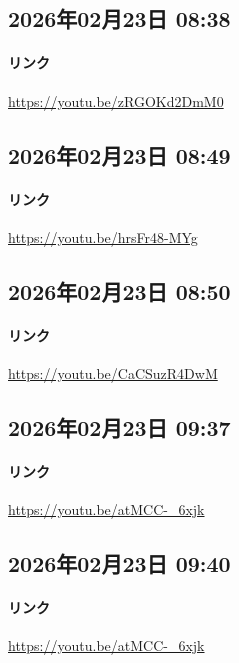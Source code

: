 \subsection*{2026年02月23日 08:38}

\paragraph{リンク}
\url{https://youtu.be/zRGOKd2DmM0}

\subsection*{2026年02月23日 08:49}

\paragraph{リンク}
\url{https://youtu.be/hrsFr48-MYg}

\subsection*{2026年02月23日 08:50}

\paragraph{リンク}
\url{https://youtu.be/CaCSuzR4DwM}

\subsection*{2026年02月23日 09:37}

\paragraph{リンク}
\url{https://youtu.be/atMCC-_6xjk}

\subsection*{2026年02月23日 09:40}

\paragraph{リンク}
\url{https://youtu.be/atMCC-_6xjk}

